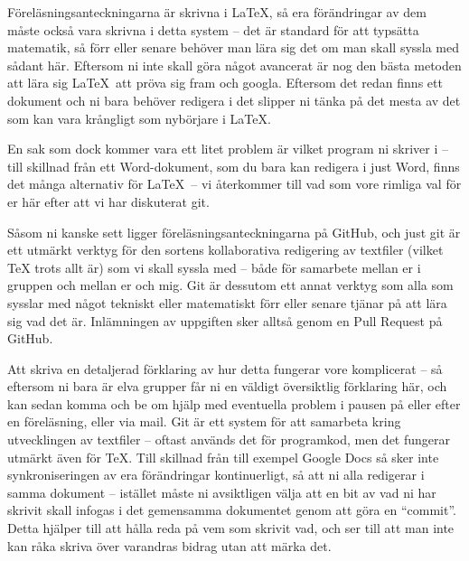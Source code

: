\documentclass{tufte-handout}
\begin{document}
Föreläsningsanteckningarna är skrivna i \LaTeX, så era förändringar av dem måste också vara skrivna i detta system -- det är standard för att typsätta matematik, så förr eller senare behöver man lära sig det om man skall syssla med sådant här. Eftersom ni inte skall göra något avancerat är nog den bästa metoden att lära sig \LaTeX\ att pröva sig fram och googla. Eftersom det redan finns ett dokument och ni bara behöver redigera i det slipper ni tänka på det mesta av det som kan vara krångligt som nybörjare i \LaTeX.

En sak som dock kommer vara ett litet problem är vilket program ni skriver i -- till skillnad från ett Word-dokument, som du bara kan redigera i just Word, finns det många alternativ för \LaTeX\ -- vi återkommer till vad som vore rimliga val för er här efter att vi har diskuterat git.

Såsom ni kanske sett ligger föreläsningsanteckningarna på GitHub, och just git är ett utmärkt verktyg för den sortens kollaborativa redigering av textfiler (vilket TeX trots allt är) som vi skall syssla med -- både för samarbete mellan er i gruppen och mellan er och mig. Git är dessutom ett annat verktyg som alla som sysslar med något tekniskt eller matematiskt förr eller senare tjänar på att lära sig vad det är. Inlämningen av uppgiften sker alltså genom en Pull Request på GitHub.

Att skriva en detaljerad förklaring av hur detta fungerar vore komplicerat -- så eftersom ni bara är elva grupper får ni en väldigt översiktlig förklaring här, och kan sedan komma och be om hjälp med eventuella problem i pausen på eller efter en föreläsning, eller via mail. Git är ett system för att samarbeta kring utvecklingen av textfiler -- oftast används det för programkod, men det fungerar utmärkt även för TeX. Till skillnad från till exempel Google Docs så sker inte synkroniseringen av era förändringar kontinuerligt, så att ni alla redigerar i samma dokument -- istället måste ni avsiktligen välja att en bit av vad ni har skrivit skall infogas i det gemensamma dokumentet genom att göra en ``commit''. Detta hjälper till att hålla reda på vem som skrivit vad, och ser till att man inte kan råka skriva över varandras bidrag utan att märka det.
\end{document}
